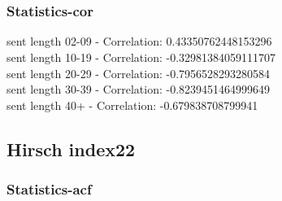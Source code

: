 \documentclass{article}%
\begin{document}
\begin{figure}[ht]%
\centering%
\setlength{\abovecaptionskip}{-35pt}%
%
%
\\%
%
%
\\%
%
\end{figure}

%
\newpage%
\subsubsection{Statistics{-}cor}%
\label{ssubsec:Statistics{-}cor}%
\noindent%
sent length 02-09 - Correlation: 0.43350762448153296\\%
sent length 10-19 - Correlation: -0.32981384059111707\\%
sent length 20-29 - Correlation: -0.7956528293280584\\%
sent length 30-39 - Correlation: -0.8239451464999649\\%
sent length 40+ - Correlation: -0.679838708799941\\

%
\newpage

%
\subsection{Hirsch index22}%
\label{subsec:Hirschindex22}%
\subsubsection{Statistics{-}acf}%
\label{ssubsec:Statistics{-}acf}%
\end{document}
